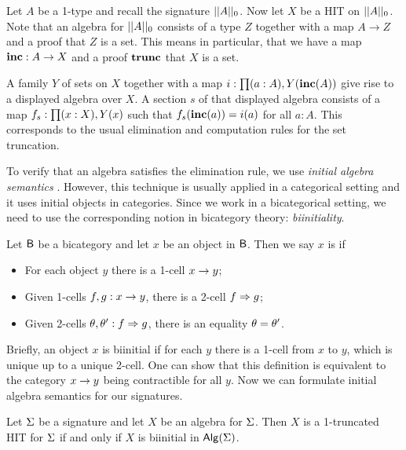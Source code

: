 \begin{example}
Let $A$ be a 1-type and recall the signature $|| A ||_0$.
Now let $X$ be a HIT on $|| A ||_0$.
Note that an algebra for $|| A ||_0$ consists of a type $Z$ together with a map $A \rightarrow Z$
and a proof that $Z$ is a set.
This means in particular, that we have a map $\operatorname{\mathbf{inc}} : A \rightarrow X$ and a proof $\operatorname{\mathbf{trunc}}$
that $X$ is a set.

A family $Y$ of sets on $X$ together with a map $i : \prod (a  : A) , Y(\operatorname{\mathbf{inc}}(A))$
give rise to a displayed algebra over $X$.
A section $s$ of that displayed algebra consists of a map $f_s : \prod (x : X) , Y(x)$
such that $f_s(\operatorname{\mathbf{inc}}(a)) = i(a)$ for all $a : A$.
This corresponds to the usual elimination and computation rules for the
set truncation.
\end{example}

To verify that an algebra satisfies the elimination rule, we use \emph{initial algebra semantics} \cite{hermida1998structural}.
However, this technique is usually applied in a categorical setting and it uses initial objects in categories.
Since we work in a bicategorical setting, we need to use the corresponding notion in bicategory theory: \emph{biinitiality}.

\begin{definition}
Let $\mathsf{B}$ be a bicategory and let $x$ be an object in $\mathsf{B}$.
Then we say $x$ is  if
\begin{itemize}
	\item For each object $y$ there is a 1-cell $x \rightarrow y$;
	\item Given 1-cells $f, g : x \rightarrow y$, there is a 2-cell $f \Rightarrow g$;
	\item Given 2-cells $\theta, \theta' : f \Rightarrow g$, there is an equality $\theta = \theta'$.
\end{itemize}
\end{definition}

Briefly, an object $x$ is biinitial if for each $y$ there is a 1-cell from $x$ to $y$, which is unique up to a unique 2-cell.
One can show that this definition is equivalent to the category $x \rightarrow y$ being contractible for all $y$.
Now we can formulate initial algebra semantics for our signatures.

\begin{proposition}
\label{thm:initial_alg_sem}
Let $\Sigma$ be a signature and let $X$ be an algebra for $\Sigma$.
Then $X$ is a 1-truncated HIT for $\Sigma$ if and only if $X$ is biinitial in $\mathsf{Alg}(\Sigma)$.
\end{proposition}

